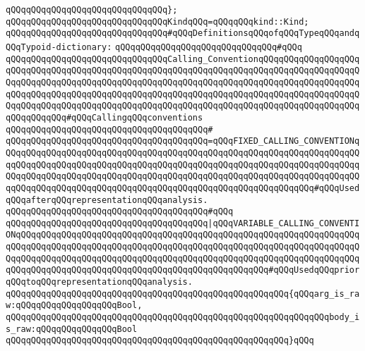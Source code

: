 \verb|qQQqqQQqqQQqqQQqqQQqqQQqqQQqqQQq};|\newline
\verb|qQQqqQQqqQQqqQQqqQQqqQQqqQQqqQQqKindqQQq=qQQqqQQqkind::Kind;|\newline
\newline
\newline
\newline
\verb|qQQqqQQqqQQqqQQqqQQqqQQqqQQqqQQq#qQQqDefinitionsqQQqofqQQqTypeqQQqandqQQqTypoid-dictionary:|\newline
\verb|qQQqqQQqqQQqqQQqqQQqqQQqqQQqqQQq#qQQq|\newline
\newline
\verb|qQQqqQQqqQQqqQQqqQQqqQQqqQQqqQQqCalling_ConventionqQQqqQQqqQQqqQQqqQQqqQQqqQQqqQQqqQQqqQQqqQQqqQQqqQQqqQQqqQQqqQQqqQQqqQQqqQQqqQQqqQQqqQQqqQQqqQQqqQQqqQQqqQQqqQQqqQQqqQQqqQQqqQQqqQQqqQQqqQQqqQQqqQQqqQQqqQQqqQQqqQQqqQQqqQQqqQQqqQQqqQQqqQQqqQQqqQQqqQQqqQQqqQQqqQQqqQQqqQQqqQQqqQQqqQQqqQQqqQQqqQQqqQQqqQQqqQQqqQQqqQQqqQQqqQQqqQQqqQQqqQQqqQQqqQQqqQQqqQQqqQQqqQQqqQQq#qQQqCallingqQQqconventions|\newline
\verb|qQQqqQQqqQQqqQQqqQQqqQQqqQQqqQQqqQQqqQQq#|\newline
\verb|qQQqqQQqqQQqqQQqqQQqqQQqqQQqqQQqqQQqqQQq=qQQqFIXED_CALLING_CONVENTIONqQQqqQQqqQQqqQQqqQQqqQQqqQQqqQQqqQQqqQQqqQQqqQQqqQQqqQQqqQQqqQQqqQQqqQQqqQQqqQQqqQQqqQQqqQQqqQQqqQQqqQQqqQQqqQQqqQQqqQQqqQQqqQQqqQQqqQQqqQQqqQQqqQQqqQQqqQQqqQQqqQQqqQQqqQQqqQQqqQQqqQQqqQQqqQQqqQQqqQQqqQQqqQQqqQQqqQQqqQQqqQQqqQQqqQQqqQQqqQQqqQQqqQQqqQQqqQQqqQQqqQQqqQQqqQQq#qQQqUsedqQQqafterqQQqrepresentationqQQqanalysis.|\newline
\verb|qQQqqQQqqQQqqQQqqQQqqQQqqQQqqQQqqQQqqQQq#qQQq|\newline
\verb|qQQqqQQqqQQqqQQqqQQqqQQqqQQqqQQqqQQqqQQq|\verb#|qQQqVARIABLE_CALLING_CONVENTIONqQQqqQQqqQQqqQQqqQQqqQQqqQQqqQQqqQQqqQQqqQQqqQQqqQQqqQQqqQQqqQQqqQQqqQQqqQQqqQQqqQQqqQQqqQQqqQQqqQQqqQQqqQQqqQQqqQQqqQQqqQQqqQQqqQQqqQQqqQQqqQQqqQQqqQQqqQQqqQQqqQQqqQQqqQQqqQQqqQQqqQQqqQQqqQQqqQQqqQQqqQQqqQQqqQQqqQQqqQQqqQQqqQQqqQQqqQQqqQQqqQQqqQQqqQQqqQQqqQQq#\verb|#qQQqUsedqQQqpriorqQQqtoqQQqrepresentationqQQqanalysis.|\newline
\verb|qQQqqQQqqQQqqQQqqQQqqQQqqQQqqQQqqQQqqQQqqQQqqQQqqQQqqQQq{qQQqarg_is_raw:qQQqqQQqqQQqqQQqqQQqBool,|\newline
\verb|qQQqqQQqqQQqqQQqqQQqqQQqqQQqqQQqqQQqqQQqqQQqqQQqqQQqqQQqqQQqqQQqbody_is_raw:qQQqqQQqqQQqqQQqBool|\newline
\verb|qQQqqQQqqQQqqQQqqQQqqQQqqQQqqQQqqQQqqQQqqQQqqQQqqQQqqQQq}qQQq|\newline
